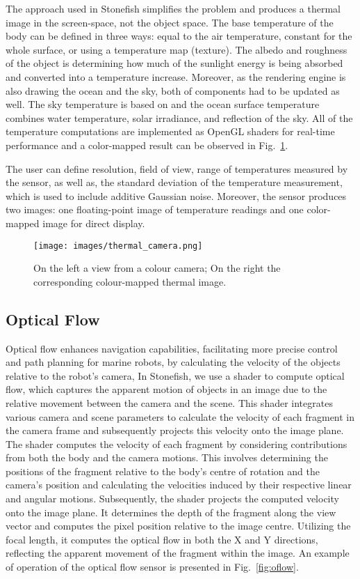 The approach used in Stonefish simplifies the problem and produces a thermal image in the screen-space, not the object space. The base temperature of the body can be defined in three ways: equal to the air temperature, constant for the whole surface, or using a temperature map (texture).
The albedo and roughness of the object is determining how much of the sunlight energy is being absorbed and converted into a temperature increase. Moreover, as the rendering engine is also drawing the ocean and the sky, both of components had to be updated as well. The sky temperature is based on \cite{AWANOU1998227} and the ocean surface temperature combines water temperature, solar irradiance, and reflection of the sky. All of the temperature computations are implemented as OpenGL shaders for real-time performance and a color-mapped result can be observed in Fig.~\ref{fig:thermal}.

The user can define resolution, field of view, range of temperatures measured by the sensor, as well as, the standard deviation of the temperature measurement, which is used to include additive Gaussian noise. Moreover, the sensor produces two images: one floating-point image of temperature readings and one color-mapped image for direct display.

\begin{figure}[t]
  \centering
  \texttt{[image: images/thermal\_camera.png]}
  \caption{On the left a view from a colour camera; On the right the corresponding colour-mapped thermal image.} 
  \label{fig:thermal}
\end{figure}



\subsection{Optical Flow}
Optical flow enhances navigation capabilities, facilitating more precise control and path planning for marine robots, by calculating the velocity of the objects relative to the robot's camera, 
In Stonefish, we use a shader to compute optical flow, which captures the apparent motion of objects in an image due to the relative movement between the camera and the scene. This shader integrates various camera and scene parameters to calculate the velocity of each fragment in the camera frame and subsequently projects this velocity onto the image plane.
The shader computes the velocity of each fragment by considering contributions from both the body and the camera motions. This involves determining the positions of the fragment relative to the body's centre of rotation and the camera's position and calculating the velocities induced by their respective linear and angular motions.
Subsequently, the shader projects the computed velocity onto the image plane. It determines the depth of the fragment along the view vector and computes the pixel position relative to the image centre. Utilizing the focal length, it computes the optical flow in both the X and Y directions, reflecting the apparent movement of the fragment within the image. An example of operation of the optical flow sensor is presented in Fig.~\ref{fig:oflow}.


